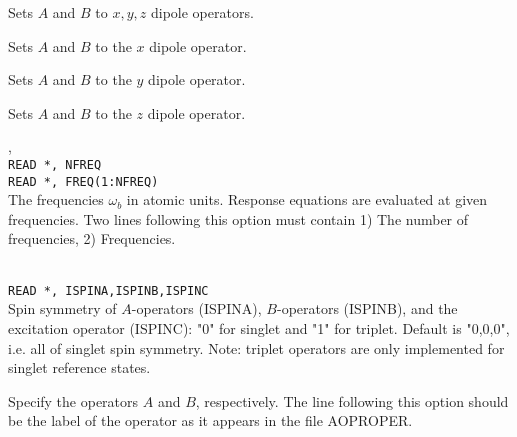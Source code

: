 \begin{description}
\item{}
Sets $A$ and $B$ to $x, y, z$ dipole operators.

\item{}
Sets $A$ and $B$ to the $x$ dipole operator.

\item{}
Sets $A$ and $B$ to the $y$ dipole operator.

\item{}
Sets $A$ and $B$ to the $z$ dipole operator.

\item{, }\\
\verb|READ *, NFREQ|\\
\verb|READ *, FREQ(1:NFREQ)|\\
The frequencies $\omega_b$ in atomic units.
Response equations are evaluated at given
frequencies. Two lines 
following this option must contain 1) The number of frequencies, 2)
Frequencies.

\item{}\\
\verb|READ *, ISPINA,ISPINB,ISPINC|\\
Spin symmetry of $A$-operators (ISPINA), $B$-operators (ISPINB),
and the excitation operator (ISPINC): "0" for singlet and "1" for triplet.
Default is "0,0,0", i.e. all of singlet spin symmetry.
Note: triplet operators are only implemented for singlet reference states.

\item[\Key{APROP}, \Key{BPROP}]
Specify the operators $A$ and $B$, respectively. The line following this
option should be the label of the operator as it appears in the file
AOPROPER.


\end{description}
